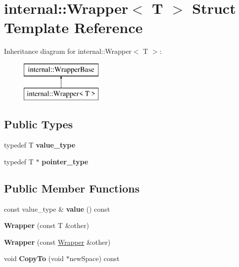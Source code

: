 \hypertarget{structinternal_1_1Wrapper}{}\section{internal\+:\+:Wrapper$<$ T $>$ Struct Template Reference}
\label{structinternal_1_1Wrapper}
Inheritance diagram for internal\+:\+:Wrapper$<$ T $>$\+:\begin{figure}[H]
\begin{center}
\leavevmode
\includegraphics[height=2.000000cm]{structinternal_1_1Wrapper}
\end{center}
\end{figure}
\subsection*{Public Types}
\begin{DoxyCompactItemize}
\item 
\hypertarget{structinternal_1_1Wrapper_a17fdc23c0375d5bb6a5442fb2b4821e3}{}typedef T {\bfseries value\+\_\+type}\label{structinternal_1_1Wrapper_a17fdc23c0375d5bb6a5442fb2b4821e3}

\item 
\hypertarget{structinternal_1_1Wrapper_a0c8302915c6279531a9a160908d21f67}{}typedef T $\ast$ {\bfseries pointer\+\_\+type}\label{structinternal_1_1Wrapper_a0c8302915c6279531a9a160908d21f67}

\end{DoxyCompactItemize}
\subsection*{Public Member Functions}
\begin{DoxyCompactItemize}
\item 
\hypertarget{structinternal_1_1Wrapper_ab1f3c80877fa88f78a00c819839db814}{}const value\+\_\+type \& {\bfseries value} () const \label{structinternal_1_1Wrapper_ab1f3c80877fa88f78a00c819839db814}

\item 
\hypertarget{structinternal_1_1Wrapper_a995a5f74d34284e20ca2f566987e7a17}{}{\bfseries Wrapper} (const T \&other)\label{structinternal_1_1Wrapper_a995a5f74d34284e20ca2f566987e7a17}

\item 
\hypertarget{structinternal_1_1Wrapper_a6d756167b327214d7e6034e791ee376c}{}{\bfseries Wrapper} (const \hyperlink{structinternal_1_1Wrapper}{Wrapper} \&other)\label{structinternal_1_1Wrapper_a6d756167b327214d7e6034e791ee376c}

\item 
\hypertarget{structinternal_1_1Wrapper_addf812b301b450af381ef0f89e079f35}{}void {\bfseries Copy\+To} (void $\ast$new\+Space) const \label{structinternal_1_1Wrapper_addf812b301b450af381ef0f89e079f35}

\end{DoxyCompactItemize}


